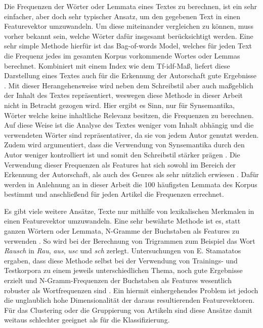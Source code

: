 Die Frequenzen der Wörter oder Lemmata eines Textes zu berechnen, ist ein sehr einfacher, aber doch sehr typischer Ansatz, um den gegebenen Text in einen Featurevektor umzuwandeln. Um diese miteinander vergleichen zu können, muss vorher bekannt sein, welche Wörter dafür insgesamt berücksichtigt werden. Eine sehr simple Methode hierfür ist das Bag-of-words Model, welches für jeden Text die Frequenz jedes im gesamten Korpus vorkommende Wortes oder Lemmas berechnet. Kombiniert mit einem Index wie dem Tf-idf-Maß, liefert diese Darstellung eines Textes auch für die Erkennung der Autorschaft gute Ergebnisse \cite[S.~12]{sebastiani2002machine}. Mit dieser Herangehensweise wird neben dem Schreibstil aber auch maßgeblich der Inhalt des Textes repräsentiert, weswegen diese Methode in dieser Arbeit nicht in Betracht gezogen wird. Hier ergibt es Sinn, nur für Synsemantika, Wörter welche keine inhaltliche Relevanz besitzen, die Frequenzen zu berechnen. Auf diese Weise ist die Analyse des Textes weniger vom Inhalt abhängig und die verwendeten Wörter sind repräsentativer, da sie von jedem Autor genutzt werden. Zudem wird argumentiert, dass die Verwendung von Synsemantika durch den Autor weniger kontrolliert ist und somit den Schreibstil stärker prägen \cite[S.~60-61]{kestemont2014function}. Die Verwendung dieser Frequenzen als Features hat sich sowohl im Bereich der Erkennung der Autorschaft, als auch des Genres als sehr nützlich erwiesen \cite{cimino2017identifying,stamatatos2009survey,zheng2006framework,argamon2005measuring}. Dafür werden in Anlehnung an \cite{cimino2017identifying} in dieser Arbeit die 100 häufigsten Lemmata des Korpus bestimmt und anschließend für jeden Artikel die Frequenzen errechnet.

Es gibt viele weitere Ansätze, Texte nur mithilfe von lexikalischen Merkmalen in einen Featurevektor umzuwandeln. Eine sehr bewährte Methode ist es, statt ganzen Wörtern oder Lemmata, N-Gramme der Buchstaben als Features zu verwenden \cite[S.~542]{stamatatos2009survey}. So wird bei der Berechnung von Trigrammen zum Beispiel das Wort \textit{Rausch} in \textit{Rau}, \textit{aus}, \textit{usc} und \textit{sch} zerlegt. Untersuchungen von E. Stamatatos ergaben, dass diese Methode selbst bei der Verwendung von Trainings- und Testkorpora zu einem jeweils unterschiedlichen Thema, noch gute Ergebnisse erzielt und N-Gramm-Frequenzen der Buchstaben als Features wesentlich robuster als Wortfrequenzen sind \cite{stamatatos2013robustness}. Ein hiermit einhergehendes Problem ist jedoch die unglaublich hohe Dimensionalität der daraus resultierenden Featurevektoren. Für das Clustering oder die Gruppierung von Artikeln sind diese Ansätze damit weitaus schlechter geeignet als für die Klassifizierung.


